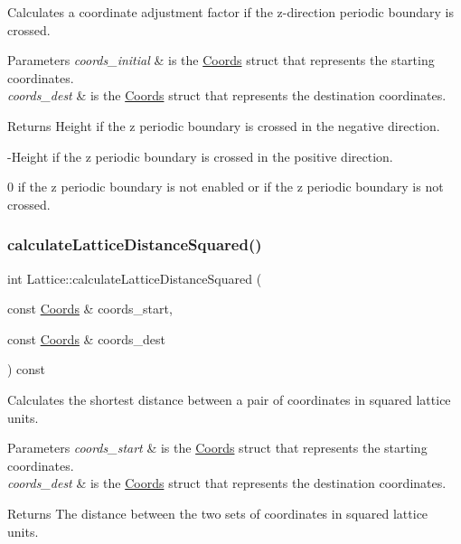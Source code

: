Calculates a coordinate adjustment factor if the z-\/direction periodic boundary is crossed. 


\begin{DoxyParams}{Parameters}
{\em coords\+\_\+initial} & is the \hyperlink{struct_coords}{Coords} struct that represents the starting coordinates. \\
\hline
{\em coords\+\_\+dest} & is the \hyperlink{struct_coords}{Coords} struct that represents the destination coordinates. \\
\hline
\end{DoxyParams}
\begin{DoxyReturn}{Returns}
Height if the z periodic boundary is crossed in the negative direction. 

-\/\+Height if the z periodic boundary is crossed in the positive direction. 

0 if the z periodic boundary is not enabled or if the z periodic boundary is not crossed. 
\end{DoxyReturn}
\mbox{\label{class_lattice_a3f51b0b41cf0e43e0469320310494a1e}} 
\subsubsection{\texorpdfstring{calculate\+Lattice\+Distance\+Squared()}{calculateLatticeDistanceSquared()}}
{\footnotesize\ttfamily int Lattice\+::calculate\+Lattice\+Distance\+Squared (\begin{DoxyParamCaption}\item[{const \hyperlink{struct_coords}{Coords} \&}]{coords\+\_\+start,  }\item[{const \hyperlink{struct_coords}{Coords} \&}]{coords\+\_\+dest }\end{DoxyParamCaption}) const}



Calculates the shortest distance between a pair of coordinates in squared lattice units. 


\begin{DoxyParams}{Parameters}
{\em coords\+\_\+start} & is the \hyperlink{struct_coords}{Coords} struct that represents the starting coordinates. \\
\hline
{\em coords\+\_\+dest} & is the \hyperlink{struct_coords}{Coords} struct that represents the destination coordinates. \\
\hline
\end{DoxyParams}
\begin{DoxyReturn}{Returns}
The distance between the two sets of coordinates in squared lattice units. 
\end{DoxyReturn}
\mbox{\label{class_lattice_ad0592298c4b92e9e84a768b95cd6d0f0}} 
